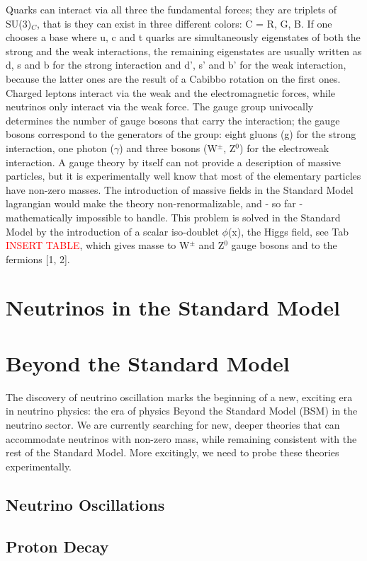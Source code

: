 Quarks can interact via all three the fundamental forces; they are triplets of SU(3)$_C$, that is they can exist in three different colors: C = R, G, B. If one chooses a base where u, c and t quarks are simultaneously eigenstates of both the strong and the weak interactions, the remaining eigenstates are usually written as d, s and b for the strong interaction and d', s' and b' for the weak interaction, because the latter ones are the result of a Cabibbo rotation on the first ones.
Charged leptons interact via the weak and the electromagnetic forces, while neutrinos only interact via the weak force. 
The gauge group univocally determines the number of gauge bosons that carry the interaction; the gauge bosons correspond to the generators of the group: eight gluons (g) for the strong interaction, one photon ($\gamma$) and three bosons (W$^\pm$, Z$^0$) for the electroweak interaction.
A gauge theory by itself can not provide a description of massive particles, but it is experimentally well know that most of the elementary particles have non-zero masses. The introduction of massive fields in the Standard Model lagrangian would make the theory non-renormalizable, and - so far - mathematically impossible to handle. This problem is solved in the Standard Model by the introduction of a scalar iso-doublet $\phi$(x), the Higgs field, see Tab \textcolor{red}{INSERT TABLE}, which gives masse to W$^\pm$ and Z$^0$ gauge bosons and to the fermions [1, 2].


\section{Neutrinos in the Standard Model}
\section{Beyond the Standard Model}
The discovery of neutrino oscillation marks  the beginning of a new, exciting era in neutrino physics: the era of physics Beyond the Standard Model (BSM) in the neutrino sector.
We are currently searching for new, deeper theories that can accommodate neutrinos with non-zero mass, while remaining consistent with the rest of the Standard Model. More excitingly, we need to probe these theories experimentally. 
\subsection{Neutrino Oscillations}
\subsection{Proton Decay}
